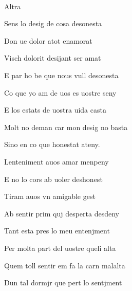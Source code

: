\documentclass[12pt]{article}
\renewcommand{\espaiAbansEtiquetaPoema}{\vspace{0ex}}
\begin{document}
\begin{estrofa}

\espaiAbansEtiquetaPoema

\\

\begin{rubrica}

Altra

\end{rubrica}
  
\end{estrofa}


\begin{estrofa}

 Sens lo desig de cosa desonesta

 Don ue dolor atot enamorat

 Visch dolorit desijant ser amat

 E par ho be que nous vull desonesta

 Co que yo am de uos es uostre seny

 E los estats de uostra uida casta

 Molt no deman car mon desig no basta

 Sino en co que honestat ateny.

\end{estrofa}



\begin{estrofa}

 Lenteniment auos amar menpeny

 E no lo cors ab uoler deshonest

 Tiram auos vn amigable gest

 Ab sentir prim quj desperta desdeny

 Tant esta pres lo meu entenjment

 Per molta part del uostre queli alta

 Quem toll sentir em fa la carn malalta

 Dun tal dormjr que pert lo sentjment

\end{estrofa}
\end{document}
